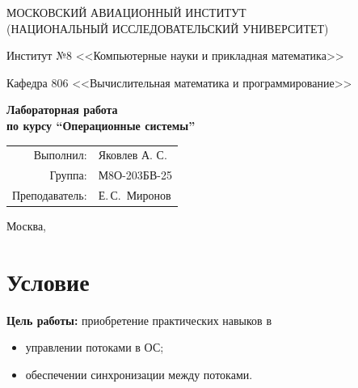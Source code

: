 \documentclass[pdf, unicode, 12pt, a4paper, oneside, fleqn]{article}
\begin{document}
\begin{titlepage}
\begin{center}
\large
МОСКОВСКИЙ АВИАЦИОННЫЙ ИНСТИТУТ\\ (НАЦИОНАЛЬНЫЙ ИССЛЕДОВАТЕЛЬСКИЙ УНИВЕРСИТЕТ)

\vspace{20pt}

Институт №8 <<Компьютерные науки и прикладная математика>>

Кафедра 806 <<Вычислительная математика и программирование>>
\end{center}

\vspace{60pt}

\begin{center}
\bfseries
\large
Лабораторная работа  \\по курсу \enquote{Операционные системы}

\vspace{54pt}

\end{center}

\vfill

\begin{flushright}
\large
\begin{tabular}{rl}
Выполнил: & Яковлев А. С. \\
Группа: & М8О-203БВ-25 \\
Преподаватель: & Е.\,С.~Миронов \\
\end{tabular}
\end{flushright}

\vspace{92pt}

\begin{center}
\large
Москва, \the\year
\end{center}
\end{titlepage}

\pagebreak

\section{Условие}
{\bfseries Цель работы:} приобретение практических навыков в
\begin{itemize}[nosep]
    \item управлении потоками в ОС;
    \item обеспечении синхронизации между потоками.
\end{itemize}
\end{document}
